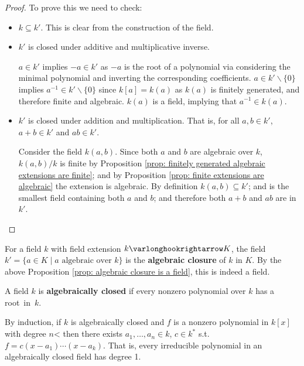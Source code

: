 \documentclass{article}
\begin{document}
\begin{proof}
    To prove this we need to check:
    \begin{itemize}
        \item $k \subseteq k'$. This is clear from the construction of the field.
        \item $k'$ is closed under additive and multiplicative inverse. 
        
        $a \in k'$ implies $-a \in k'$ as $-a$ is the root of a polynomial via considering the minimal polynomial and inverting the corresponding coefficients. $a \in k' \smallsetminus \{0\}$ implies $a^{-1} \in k' \smallsetminus \{0\}$ since $k[a] = k(a)$ as $k(a)$ is finitely generated, and therefore finite and algebraic. $k(a)$ is a field, implying that $a^{-1} \in k(a)$.
        \item $k'$ is closed under addition and multiplication. That is, for all $a, b \in k'$, $a + b \in k'$ and $ab \in k'$.

        Consider the field $k(a, b)$. Since both $a$ and $b$ are algebraic over $k$, $k(a, b)/k$ is finite by Proposition \ref{prop: finitely generated algebraic extensions are finite}; and by Proposition \ref{prop: finite extensions are algebraic} the extension is algebraic. By definition $k(a, b) \subseteq k'$; and is the smallest field containing both $a$ and $b$; and therefore both $a + b$ and $ab$ are in $k'$.
    \end{itemize}
\end{proof}

\begin{definition}\label{def: algebraic closure with ambient field}
    For a field $k$ with field extension $k \ext K$, the field $k' = \{a \in K \mid \text{$a$ algebraic over $k$}\}$ is the \textbf{algebraic closure} of $k$ in $K$. By the above Proposition \ref{prop: algebraic closure is a field}, this is indeed a field.
\end{definition}
\nogap
\begin{definition}
    A field $k$ is \textbf{algebraically closed} if every nonzero polynomial over $k$ has a \mbox{root in $k$.}
\end{definition}

\begin{remark}
    By induction, if $k$ is algebraically closed and $f$ is a nonzero polynomial in $k[x]$ with degree $n$< then there exists $a_1, \dots, a_n \in k$, $c \in k^{\ast}$ s.t. $f = c(x - a_1) \cdots (x - a_k)$. That is, every irreducible polynomial in an algebraically closed field has degree 1.
\end{remark}
\end{document}
